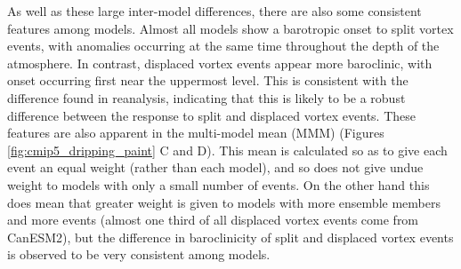 As well as these large inter-model differences, there are also some consistent
features among models. Almost all models show a barotropic onset to split vortex
events, with anomalies occurring at the same time throughout the depth of the
atmosphere. In contrast, displaced vortex events appear more baroclinic, with
onset occurring first near the uppermost level. This is consistent with the
difference found in reanalysis, indicating that this is likely to be a robust
difference between the response to split and displaced vortex events. These
features are also apparent in the multi-model mean (MMM) (Figures
\ref{fig:cmip5_dripping_paint} C and D). This mean is calculated so as to give
each event an equal weight (rather than each model), and so does not give undue
weight to models with only a small number of events. On the other hand this does
mean that greater weight is given to models with more ensemble members and more
events (almost one third of all displaced vortex events come from CanESM2), but
the difference in baroclinicity of split and displaced vortex events is observed
to be very consistent among models.

